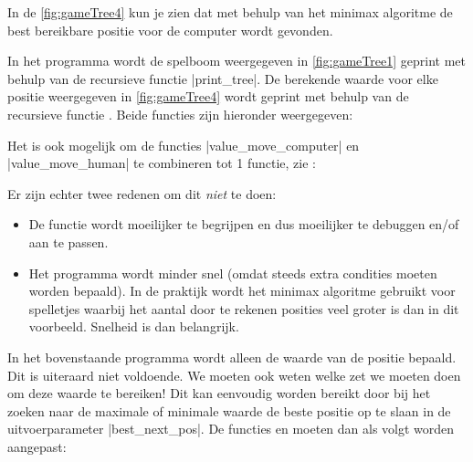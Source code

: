 \begin{cpplstShortInline}
\begin{enumerate}[leftmargin=1.4em]
	
\end{enumerate}

In de \cref{fig:gameTree4} kun je zien dat met behulp van het minimax algoritme de best bereikbare positie voor de computer wordt gevonden.

In het programma  wordt de spelboom weergegeven in \cref{fig:gameTree1} geprint met behulp van de recursieve functie |print_tree|.
De berekende waarde voor elke positie weergegeven in \cref{fig:gameTree4} wordt geprint met behulp van de recursieve functie .
Beide functies zijn hieronder weergegeven:


Het is ook mogelijk om de functies |value_move_computer| en |value_move_human| te combineren tot 1 functie, zie :


Er zijn echter twee redenen om dit \emph{niet} te doen:\begin{itemize}
	\item De functie wordt moeilijker te begrijpen en dus moeilijker te debuggen en/of aan te passen.
	\item Het programma wordt minder snel (omdat steeds extra condities moeten worden bepaald).
	In de praktijk wordt het minimax algoritme gebruikt voor spelletjes waarbij het aantal door te rekenen posities veel groter is dan in dit voorbeeld.
	Snelheid is dan belangrijk.
\end{itemize}
In het bovenstaande programma wordt alleen de waarde van de positie bepaald.
Dit is uiteraard niet voldoende.
We moeten ook weten welke zet we moeten doen om deze waarde te bereiken!
Dit kan eenvoudig worden bereikt door bij het zoeken naar de maximale of minimale waarde de beste positie op te slaan in de uitvoerparameter |best_next_pos|.
De functies  en  moeten dan als volgt worden aangepast:


\end{cpplstShortInline}
